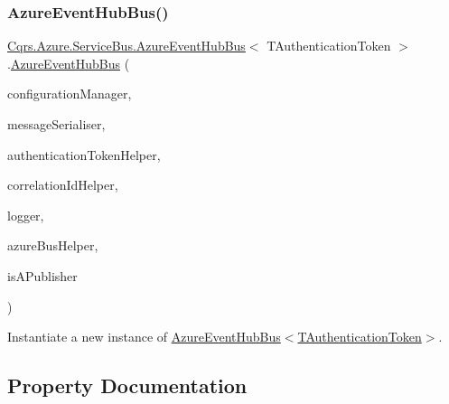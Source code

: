 \subsubsection{\texorpdfstring{Azure\+Event\+Hub\+Bus()}{AzureEventHubBus()}}
{\footnotesize\ttfamily \hyperlink{classCqrs_1_1Azure_1_1ServiceBus_1_1AzureEventHubBus}{Cqrs.\+Azure.\+Service\+Bus.\+Azure\+Event\+Hub\+Bus}$<$ T\+Authentication\+Token $>$.\hyperlink{classCqrs_1_1Azure_1_1ServiceBus_1_1AzureEventHubBus}{Azure\+Event\+Hub\+Bus} (\begin{DoxyParamCaption}\item[{\hyperlink{interfaceCqrs_1_1Configuration_1_1IConfigurationManager}{I\+Configuration\+Manager}}]{configuration\+Manager,  }\item[{\hyperlink{interfaceCqrs_1_1Azure_1_1ServiceBus_1_1IMessageSerialiser}{I\+Message\+Serialiser}$<$ T\+Authentication\+Token $>$}]{message\+Serialiser,  }\item[{\hyperlink{interfaceCqrs_1_1Authentication_1_1IAuthenticationTokenHelper}{I\+Authentication\+Token\+Helper}$<$ T\+Authentication\+Token $>$}]{authentication\+Token\+Helper,  }\item[{I\+Correlation\+Id\+Helper}]{correlation\+Id\+Helper,  }\item[{I\+Logger}]{logger,  }\item[{\hyperlink{interfaceCqrs_1_1Azure_1_1ServiceBus_1_1IAzureBusHelper}{I\+Azure\+Bus\+Helper}$<$ T\+Authentication\+Token $>$}]{azure\+Bus\+Helper,  }\item[{bool}]{is\+A\+Publisher }\end{DoxyParamCaption})\hspace{0.3cm}{\ttfamily [protected]}}



Instantiate a new instance of \hyperlink{classCqrs_1_1Azure_1_1ServiceBus_1_1AzureEventHubBus_aef24d23dd76d6bb0f58b582e2abf9872_aef24d23dd76d6bb0f58b582e2abf9872}{Azure\+Event\+Hub\+Bus$<$\+T\+Authentication\+Token$>$}. 



\subsection{Property Documentation}
\mbox{\label{classCqrs_1_1Azure_1_1ServiceBus_1_1AzureEventHubBus_ac70c513a41f42208cc3332d4ed855af8_ac70c513a41f42208cc3332d4ed855af8}} 
